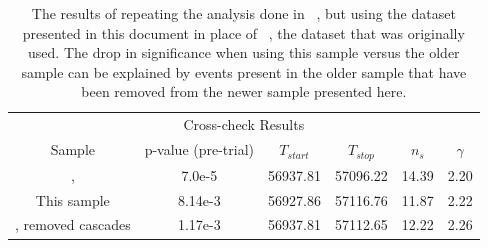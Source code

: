 \documentclass[aps,10pt,prd,twocolumn,floats,letterpaper,showpacs,nofootinbib,bibnotes,notitlepage,superscriptaddress,floatfix]{revtex4-1}
\begin{document}
\begin{table}
\centering
\begin{ruledtabular}
\begin{tabular}{cccccc}
\multicolumn{6}{c}{Cross-check Results} \\[0.1cm]
Sample & p-value (pre-trial) & $T_{start}$ & $T_{stop}$ & $n_s$ & $\gamma$\\ 
\cite{IceCube:2018cha}, \cite{IceCube:2019} & 7.0e-5 & 56937.81 & 57096.22 & 14.39 & 2.20 \\
This sample & 8.14e-3 & 56927.86 & 57116.76 & 11.87 & 2.22 \\
\cite{IceCube:2018cha}, removed cascades & 1.17e-3 & 56937.81 & 57112.65 & 12.22 & 2.26 \\
\end{tabular}
\end{ruledtabular}
\caption[]{The results of repeating the analysis done in ~\cite{IceCube:2018cha}, but using the dataset presented in this document in place of ~\cite{IceCube:2019}, the dataset that was originally used. The drop in significance when using this sample versus the older sample can be explained by events present in the older sample that have been removed from the newer sample presented here.}\label{tab:TXSCrossChecks}
\end{table}
\end{document}
